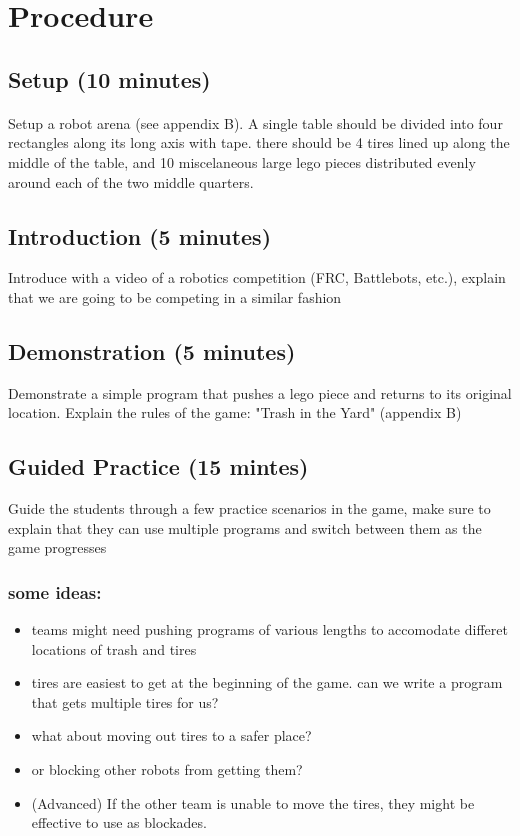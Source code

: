 \documentclass{lessonplan}
\begin{document}
  \section{Procedure}
    \subsection{Setup (10 minutes)}
      \paragraph{}
      Setup a robot arena (see appendix B).  A single table should be
      divided into four rectangles along its long axis with tape.
      there should be 4 tires lined up along the middle of the table,
      and 10 miscelaneous large lego pieces distributed evenly around
      each of the two middle quarters.

    \subsection{Introduction (5 minutes)}
      Introduce with a video of a robotics competition (FRC,
      Battlebots, etc.), explain that we are going to be competing in
      a similar fashion

    \subsection{Demonstration (5 minutes)}
      Demonstrate a simple program that pushes a lego piece and
      returns to its original location.  Explain the rules of the
      game: "Trash in the Yard" (appendix B)

    \subsection{Guided Practice (15 mintes)}
      Guide the students through a few practice scenarios in the game,
      make sure to explain that they can use multiple programs and
      switch between them as the game progresses

      \subsubsection{some ideas:}
      \begin{itemize}
        \item teams might need pushing programs of various lengths to
          accomodate differet locations of trash and tires
        \item tires are easiest to get at the beginning of the game.
          can we write a program that gets multiple tires for us?
        \item what about moving out tires to a safer place?
        \item or blocking other robots from getting them?
        \item (Advanced) If the other team is unable to move the
          tires, they might be effective to use as blockades.
      \end{itemize}
\end{document}
